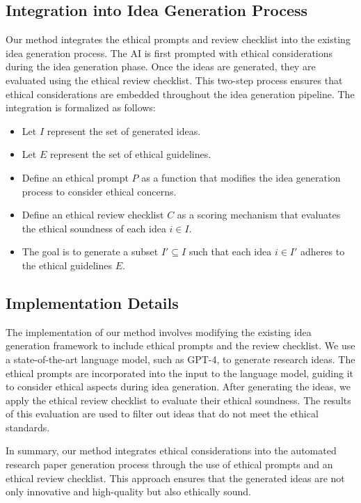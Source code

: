 \documentclass{article} %
\begin{document}
\subsection{Integration into Idea Generation Process}
Our method integrates the ethical prompts and review checklist into the existing idea generation process. The AI is first prompted with ethical considerations during the idea generation phase. Once the ideas are generated, they are evaluated using the ethical review checklist. This two-step process ensures that ethical considerations are embedded throughout the idea generation pipeline. The integration is formalized as follows:
\begin{itemize}
    \item Let \( I \) represent the set of generated ideas.
    \item Let \( E \) represent the set of ethical guidelines.
    \item Define an ethical prompt \( P \) as a function that modifies the idea generation process to consider ethical concerns.
    \item Define an ethical review checklist \( C \) as a scoring mechanism that evaluates the ethical soundness of each idea \( i \in I \).
    \item The goal is to generate a subset \( I' \subseteq I \) such that each idea \( i \in I' \) adheres to the ethical guidelines \( E \).
\end{itemize}

\subsection{Implementation Details}
The implementation of our method involves modifying the existing idea generation framework to include ethical prompts and the review checklist. We use a state-of-the-art language model, such as GPT-4, to generate research ideas. The ethical prompts are incorporated into the input to the language model, guiding it to consider ethical aspects during idea generation. After generating the ideas, we apply the ethical review checklist to evaluate their ethical soundness. The results of this evaluation are used to filter out ideas that do not meet the ethical standards.

In summary, our method integrates ethical considerations into the automated research paper generation process through the use of ethical prompts and an ethical review checklist. This approach ensures that the generated ideas are not only innovative and high-quality but also ethically sound.
\end{document}
